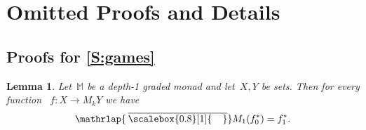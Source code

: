 \documentclass[sigconf,
			final%
			nonacm
                        ]{acmart}
\numberwithin{equation}{section}
\numberwithin{equation}{section}
\theoremstyle{plain}
\newtheorem{lem}[thm]{Lemma}
\theoremstyle{definition}
\newcommand{\mybar}[3]{%
  \mathrlap{\hspace{#2}\overline{\scalebox{#1}[1]{\hphantom{\ensuremath{#3}}\vphantom{\rule{0pt}{5.5pt}}}}}\ensuremath{#3}
}
\newcommand{\barM}{\mybar{0.8}{2pt}{M}_1}
\newcommand{\M}{\mathbb{M}}                   %
\begin{document}
%



\clearpage
\appendix
\section{Omitted Proofs and Details}

\subsection{Proofs for \cref{S:games}}

\begin{lem}\label{L:bar-kleisli}
Let~$\M$ be a depth-1 graded monad and
let~$X,Y$ be sets. Then for every function%
~$f\colon X\to M_kY$ we have
\[
\barM (f^*_0) = f^*_1.
\]
\end{lem}
\end{document}
